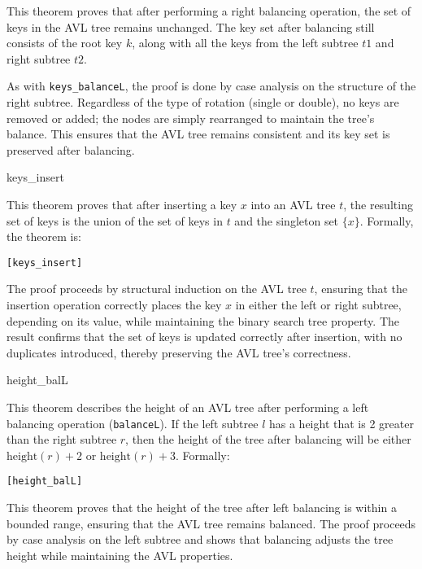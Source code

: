 This theorem proves that after performing a right balancing operation, the set of keys in the AVL tree remains unchanged. The key set after balancing still consists of the root key \( k \), along with all the keys from the left subtree \( t1 \) and right subtree \( t2 \).

As with \texttt{keys\_balanceL}, the proof is done by case analysis on the structure of the right subtree. Regardless of the type of rotation (single or double), no keys are removed or added; the nodes are simply rearranged to maintain the tree’s balance. This ensures that the AVL tree remains consistent and its key set is preserved after balancing.

\begin{thm}{keys\_insert}

This theorem proves that after inserting a key \(x\) into an AVL tree \(t\), the resulting set of keys is the union of the set of keys in \(t\) and the singleton set \(\{x\}\). Formally, the theorem is:


\begin{alltt}
	[keys_insert]
\end{alltt}
\end{thm}

The proof proceeds by structural induction on the AVL tree \( t \), ensuring that the insertion operation correctly places the key \( x \) in either the left or right subtree, depending on its value, while maintaining the binary search tree property. The result confirms that the set of keys is updated correctly after insertion, with no duplicates introduced, thereby preserving the AVL tree's correctness.

\begin{thm}{height\_balL}

This theorem describes the height of an AVL tree after performing a left balancing operation (\texttt{balanceL}). If the left subtree \(l\) has a height that is 2 greater than the right subtree \(r\), then the height of the tree after balancing will be either \(\text{height}(r) + 2\) or \(\text{height}(r) + 3\). Formally:


\begin{alltt}
	[height_balL]
\end{alltt}

\end{thm}

This theorem proves that the height of the tree after left balancing is within a bounded range, ensuring that the AVL tree remains balanced. The proof proceeds by case analysis on the left subtree and shows that balancing adjusts the tree height while maintaining the AVL properties.


